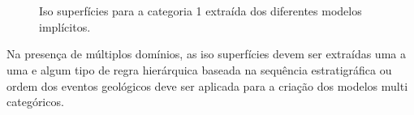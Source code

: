 \begin{figure}[H]
    \caption{Iso superfícies para a categoria 1 extraída dos diferentes modelos implícitos.} \label{isosup}
     \centering
     \\
     \\
\end{figure}

Na presença de múltiplos domínios, as iso superfícies devem ser extraídas uma a uma e algum tipo de regra hierárquica baseada na sequência estratigráfica ou ordem dos eventos geológicos deve ser aplicada para a criação dos modelos multi categóricos.

